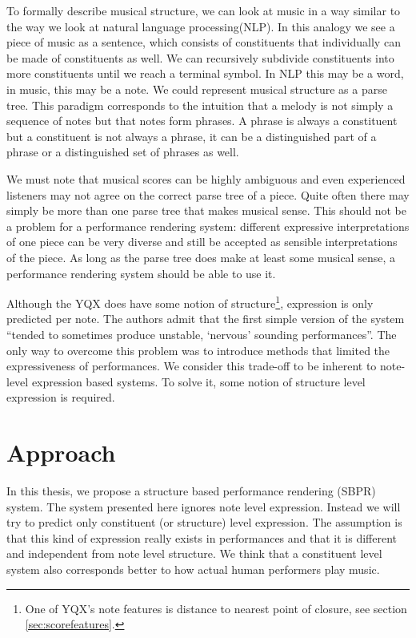 \documentclass[a4paper,10pt]{article}
\begin{document}
To formally describe musical structure, we can look at music in a way similar to the way we look at natural language processing(NLP). In this analogy we see a piece of music as a sentence, which consists of constituents that individually can be made of constituents as well. We can recursively subdivide constituents into more constituents until we reach a terminal symbol. In NLP this may be a word, in music, this may be a note. We could represent musical structure as a parse tree. This paradigm corresponds to the intuition that a melody is not simply a sequence of notes but that notes form phrases. A phrase is always a constituent but a constituent is not always a phrase, it can be a distinguished part of a phrase or a distinguished set of phrases as well. 

We must note that musical scores can be highly ambiguous and even experienced listeners may not agree on the correct parse tree of a piece. Quite often there may simply be more than one parse tree that makes musical sense. This should not be a problem for a performance rendering system: different expressive interpretations of one piece can be very diverse and still be accepted as sensible interpretations of the piece. As long as the parse tree does make at least some musical sense, a performance rendering system should be able to use it.

Although the YQX does have some notion of structure\footnote{One of YQX's note features is distance to nearest point of closure, see section \ref{sec:scorefeatures}.}, expression is only predicted per note. The authors admit that the first simple version of the system ``tended to sometimes produce unstable, `nervous' sounding performances''. The only way to overcome this problem was to introduce methods that limited the expressiveness of performances. We consider this trade-off to be inherent to note-level expression based systems. To solve it, some notion of structure level expression is required.


\section{Approach}
\label{sec:approach}

In this thesis, we propose a structure based performance rendering (SBPR) system. The system presented here ignores note level expression. Instead we will try to predict only constituent (or structure) level expression. The assumption is that this kind of expression really exists in performances and that it is different and independent from note level structure. We think that a constituent level system also corresponds better to how actual human performers play music. 
\end{document}
